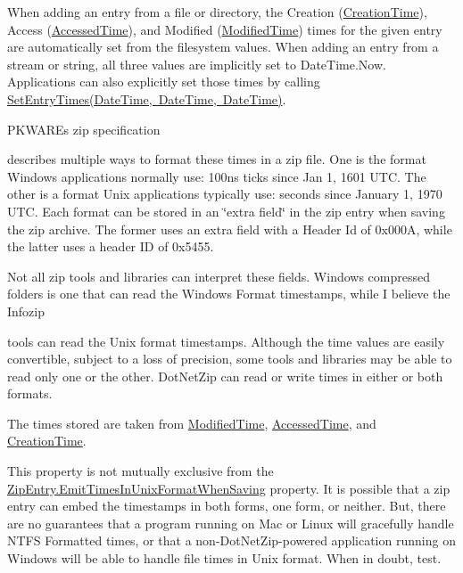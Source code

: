 When adding an entry from a file or directory, the Creation (\mbox{\hyperlink{class_super_tiled2_unity_1_1_ionic_1_1_zip_1_1_zip_entry_a38ef2ae810c3b89b1f23ebea918fb60e}{Creation\+Time}}), Access (\mbox{\hyperlink{class_super_tiled2_unity_1_1_ionic_1_1_zip_1_1_zip_entry_abc1a038c251f1ed0e2c1435a5bab23fd}{Accessed\+Time}}), and Modified (\mbox{\hyperlink{class_super_tiled2_unity_1_1_ionic_1_1_zip_1_1_zip_entry_a88021d72ea8b94c762388d92d74c2e0d}{Modified\+Time}}) times for the given entry are automatically set from the filesystem values. When adding an entry from a stream or string, all three values are implicitly set to Date\+Time.\+Now. Applications can also explicitly set those times by calling \mbox{\hyperlink{class_super_tiled2_unity_1_1_ionic_1_1_zip_1_1_zip_entry_a7331ca69b05c476a9d321b30d7649766}{Set\+Entry\+Times(\+Date\+Time, Date\+Time, Date\+Time)}}. 

P\+K\+W\+A\+RE\textquotesingle{}s zip specification

describes multiple ways to format these times in a zip file. One is the format Windows applications normally use\+: 100ns ticks since Jan 1, 1601 U\+TC. The other is a format Unix applications typically use\+: seconds since January 1, 1970 U\+TC. Each format can be stored in an \char`\"{}extra field\char`\"{} in the zip entry when saving the zip archive. The former uses an extra field with a Header Id of 0x000A, while the latter uses a header ID of 0x5455. 

Not all zip tools and libraries can interpret these fields. Windows compressed folders is one that can read the Windows Format timestamps, while I believe the Infozip

tools can read the Unix format timestamps. Although the time values are easily convertible, subject to a loss of precision, some tools and libraries may be able to read only one or the other. Dot\+Net\+Zip can read or write times in either or both formats. 

The times stored are taken from \mbox{\hyperlink{class_super_tiled2_unity_1_1_ionic_1_1_zip_1_1_zip_entry_a88021d72ea8b94c762388d92d74c2e0d}{Modified\+Time}}, \mbox{\hyperlink{class_super_tiled2_unity_1_1_ionic_1_1_zip_1_1_zip_entry_abc1a038c251f1ed0e2c1435a5bab23fd}{Accessed\+Time}}, and \mbox{\hyperlink{class_super_tiled2_unity_1_1_ionic_1_1_zip_1_1_zip_entry_a38ef2ae810c3b89b1f23ebea918fb60e}{Creation\+Time}}. 

This property is not mutually exclusive from the \mbox{\hyperlink{class_super_tiled2_unity_1_1_ionic_1_1_zip_1_1_zip_entry_afd50bda347e67681780f32ebdba43f58}{Zip\+Entry.\+Emit\+Times\+In\+Unix\+Format\+When\+Saving}} property. It is possible that a zip entry can embed the timestamps in both forms, one form, or neither. But, there are no guarantees that a program running on Mac or Linux will gracefully handle N\+T\+FS Formatted times, or that a non-\/\+Dot\+Net\+Zip-\/powered application running on Windows will be able to handle file times in Unix format. When in doubt, test. 

